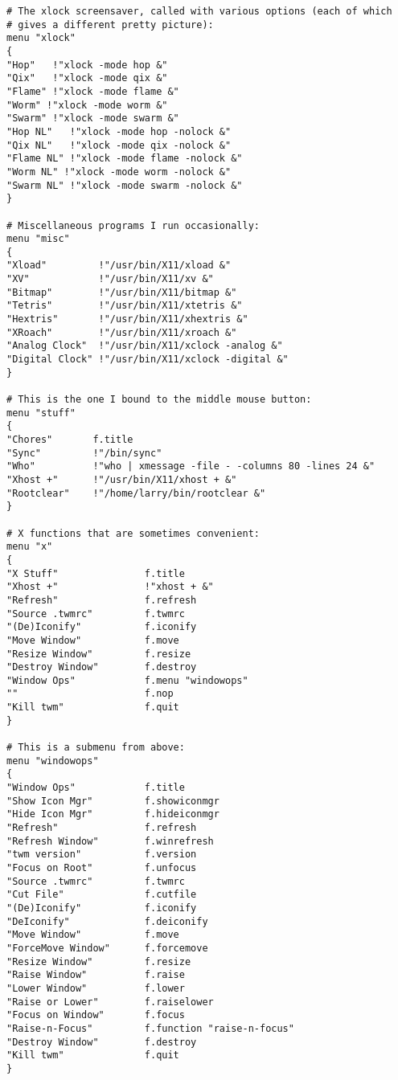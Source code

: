 \begin{screen}
\begin{verbatim}
# The xlock screensaver, called with various options (each of which
# gives a different pretty picture):
menu "xlock"
{
"Hop"   !"xlock -mode hop &"
"Qix"   !"xlock -mode qix &"
"Flame" !"xlock -mode flame &"
"Worm" !"xlock -mode worm &"
"Swarm" !"xlock -mode swarm &"
"Hop NL"   !"xlock -mode hop -nolock &"
"Qix NL"   !"xlock -mode qix -nolock &"
"Flame NL" !"xlock -mode flame -nolock &"
"Worm NL" !"xlock -mode worm -nolock &"
"Swarm NL" !"xlock -mode swarm -nolock &"
}

# Miscellaneous programs I run occasionally:
menu "misc"
{
"Xload"         !"/usr/bin/X11/xload &"
"XV"            !"/usr/bin/X11/xv &"
"Bitmap"        !"/usr/bin/X11/bitmap &"
"Tetris"        !"/usr/bin/X11/xtetris &"
"Hextris"       !"/usr/bin/X11/xhextris &"
"XRoach"        !"/usr/bin/X11/xroach &"
"Analog Clock"  !"/usr/bin/X11/xclock -analog &"
"Digital Clock" !"/usr/bin/X11/xclock -digital &"
}

# This is the one I bound to the middle mouse button:
menu "stuff"
{
"Chores"       f.title
"Sync"         !"/bin/sync"
"Who"          !"who | xmessage -file - -columns 80 -lines 24 &"
"Xhost +"      !"/usr/bin/X11/xhost + &"
"Rootclear"    !"/home/larry/bin/rootclear &"
}

# X functions that are sometimes convenient:
menu "x"
{
"X Stuff"               f.title
"Xhost +"               !"xhost + &"
"Refresh"               f.refresh
"Source .twmrc"         f.twmrc
"(De)Iconify"           f.iconify
"Move Window"           f.move
"Resize Window"         f.resize
"Destroy Window"        f.destroy
"Window Ops"            f.menu "windowops"
""                      f.nop
"Kill twm"              f.quit
}

# This is a submenu from above:
menu "windowops"
{
"Window Ops"            f.title
"Show Icon Mgr"         f.showiconmgr
"Hide Icon Mgr"         f.hideiconmgr
"Refresh"               f.refresh
"Refresh Window"        f.winrefresh
"twm version"           f.version
"Focus on Root"         f.unfocus
"Source .twmrc"         f.twmrc
"Cut File"              f.cutfile
"(De)Iconify"           f.iconify
"DeIconify"             f.deiconify
"Move Window"           f.move
"ForceMove Window"      f.forcemove
"Resize Window"         f.resize
"Raise Window"          f.raise
"Lower Window"          f.lower
"Raise or Lower"        f.raiselower
"Focus on Window"       f.focus
"Raise-n-Focus"         f.function "raise-n-focus"
"Destroy Window"        f.destroy
"Kill twm"              f.quit
}
    \end{verbatim}
\end{screen}

